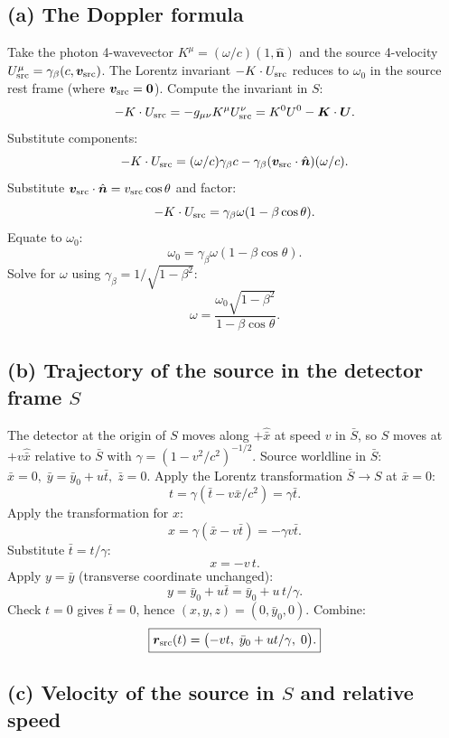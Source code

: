 \documentclass[11pt]{article}
\begin{document}
\subsection*{(a) The Doppler formula}

Take the photon 4-wavevector $K^\mu = (\omega/c)(1,\hat{\bm n})$ and the source 4-velocity $U_{\rm src}^\mu = \gamma_\beta(c,\bm v_{\rm src})$. The Lorentz invariant $-K\cdot U_{\rm src}$ reduces to $\omega_0$ in the source rest frame (where $\bm v_{\rm src}=\bm 0$). Compute the invariant in $S$:
\[ -K\cdot U_{\rm src} = -g_{\mu\nu}K^\mu U_{\rm src}^\nu = K^0 U^0 - \bm K\cdot\bm U. \]
Substitute components:
\[ -K\cdot U_{\rm src} = (\omega/c)\gamma_\beta c - \gamma_\beta(\bm v_{\rm src}\cdot\hat{\bm n})(\omega/c). \]
Substitute $\bm v_{\rm src}\cdot\hat{\bm n} = v_{\rm src}\cos\theta$ and factor:
\[ -K\cdot U_{\rm src} = \gamma_\beta\omega(1-\beta\cos\theta). \]
Equate to $\omega_0$:
\[ \omega_0 = \gamma_\beta\omega(1-\beta\cos\theta). \]
Solve for $\omega$ using $\gamma_\beta = 1/\sqrt{1-\beta^2}$:
\begin{equation}
\boxed{\omega = \frac{\omega_0\sqrt{1-\beta^2}}{1-\beta\cos\theta}.}
\label{eq:Q2a-2}
\end{equation}

\subsection*{(b) Trajectory of the source in the detector frame $S$}

The detector at the origin of $S$ moves along $+\hat{\bar x}$ at speed $v$ in $\bar S$, so $S$ moves at $+v\hat{\bar x}$ relative to $\bar S$ with $\gamma = (1-v^2/c^2)^{-1/2}$. Source worldline in $\bar S$: $\bar x = 0,\;\bar y = \bar y_0 + u\bar t,\;\bar z = 0$. Apply the Lorentz transformation $\bar S\to S$ at $\bar x=0$:
\[ t = \gamma(\bar t - v\bar x/c^2) = \gamma\bar t. \]
Apply the transformation for $x$:
\[ x = \gamma(\bar x - v\bar t) = -\gamma v\bar t. \]
Substitute $\bar t = t/\gamma$:
\[ x = -v\,t. \]
Apply $y = \bar y$ (transverse coordinate unchanged):
\[ y = \bar y_0 + u\bar t = \bar y_0 + u\,t/\gamma. \]
Check $t=0$ gives $\bar t = 0$, hence $(x,y,z)=(0,\bar y_0,0)$. Combine:
\begin{equation}
\boxed{\bm r_{\rm src}(t) = \bigl(-v t,\;\bar y_0 + u t/\gamma,\;0\bigr).}
\label{eq:Q2b-2}
\end{equation}

\subsection*{(c) Velocity of the source in $S$ and relative speed}
\end{document}
